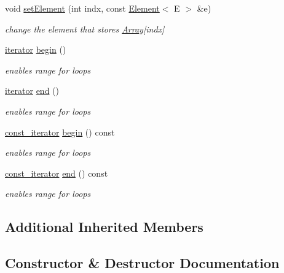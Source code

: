 \begin{DoxyCompactItemize}
void \hyperlink{classbridges_1_1datastructure_1_1_array1_d_a1494c33b1f37bc4c9bc983f1f181488f}{set\+Element} (int indx, const \hyperlink{classbridges_1_1datastructure_1_1_element}{Element}$<$ E $>$ \&e)
\begin{DoxyCompactList}\small\item\em change the element that stores \hyperlink{classbridges_1_1datastructure_1_1_array}{Array}\mbox{[}indx\mbox{]} \end{DoxyCompactList}\item 
\hyperlink{classbridges_1_1datastructure_1_1_array1_d_1_1iterator}{iterator} \hyperlink{classbridges_1_1datastructure_1_1_array1_d_ad93131c3f7f2e446bedc02d36ac7ddc5}{begin} ()
\begin{DoxyCompactList}\small\item\em enables range for loops \end{DoxyCompactList}\item 
\hyperlink{classbridges_1_1datastructure_1_1_array1_d_1_1iterator}{iterator} \hyperlink{classbridges_1_1datastructure_1_1_array1_d_a238e21eb9afcd0f32e3612b36b7d1a2a}{end} ()
\begin{DoxyCompactList}\small\item\em enables range for loops \end{DoxyCompactList}\item 
\hyperlink{classbridges_1_1datastructure_1_1_array1_d_1_1const__iterator}{const\+\_\+iterator} \hyperlink{classbridges_1_1datastructure_1_1_array1_d_a61e7a77165129de2016633ce24284417}{begin} () const
\begin{DoxyCompactList}\small\item\em enables range for loops \end{DoxyCompactList}\item 
\hyperlink{classbridges_1_1datastructure_1_1_array1_d_1_1const__iterator}{const\+\_\+iterator} \hyperlink{classbridges_1_1datastructure_1_1_array1_d_afa8c2d7cb3db9a506baa18d383aabdb5}{end} () const
\begin{DoxyCompactList}\small\item\em enables range for loops \end{DoxyCompactList}\end{DoxyCompactItemize}
\subsection*{Additional Inherited Members}


\subsection{Constructor \& Destructor Documentation}
\mbox{\label{classbridges_1_1datastructure_1_1_array1_d_a690a7802e32842acfda2688459bb2caa}} 
